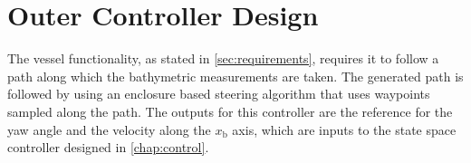 \chapter{Outer Controller Design}
The vessel functionality, as stated in \autoref{sec:requirements}, requires it to follow a path along which the bathymetric measurements are taken.   The generated path is followed by using an enclosure based steering algorithm \cite[pp. 258-265]{TFossen} that uses waypoints sampled along the path. The outputs for this controller are the reference for the yaw angle and the velocity along the $x_\mathrm{b}$ axis, which are inputs to the state space controller designed in \autoref{chap:control}. 